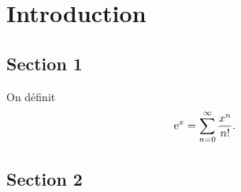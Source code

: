 \chapter{Introduction}

\section{Section 1}

On définit
\begin{equation}
  \label{eq:exp}
  \e^x = \sum_{n=0}^\infty \frac{x^n}{n!}.
\end{equation}


\section{Section 2}



\endinput
